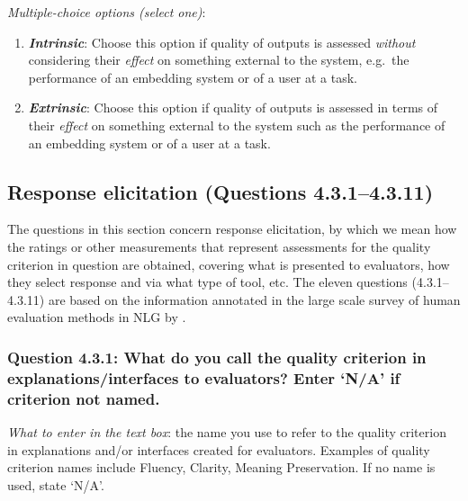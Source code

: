 \documentclass[11pt,a4paper]{article}
\newcommand{\egcvalue}[1]{\textbf{\textit{#1}}}
\begin{document}
\noindent\textit{Multiple-choice options (select one)}:  
\vspace{-.1cm}

\begin{enumerate}[itemsep=0cm,leftmargin=0.5cm,label={\LARGE $\circ$}]
    \item \egcvalue{Intrinsic}: Choose this option if quality of outputs is assessed \textit{without} considering their \textit{effect} on something external to the system, e.g.\ the performance of an embedding system or of a user at a task.
    \item \egcvalue{Extrinsic}: Choose this option if quality of outputs is assessed in terms of their \textit{effect} on something external to the system such as the performance of an embedding system or of a user at a task.
\end{enumerate}

   
\subsection{Response elicitation (Questions 4.3.1--4.3.11)}

The questions in this section concern response elicitation, by which we mean how the ratings or other measurements that represent assessments for the quality criterion in question are obtained, covering what is presented to evaluators, how they select response and via what type of tool, etc.
The eleven questions (4.3.1--4.3.11) are based on the information annotated in the large scale survey of human evaluation methods in NLG by \citet{howcroft-etal-2020-twenty}.

\vspace{-.3cm}
\subsubsection*{Question 4.3.1: What do you call the quality criterion in explanations/interfaces to evaluators?  Enter `N/A' if criterion not named.}

\noindent\textit{What to enter in the text box}: the name you use to refer to the quality criterion in explanations and/or interfaces created for evaluators. Examples of quality criterion names include Fluency, Clarity, Meaning Preservation. If no name is used, state `N/A'.
\end{document}
